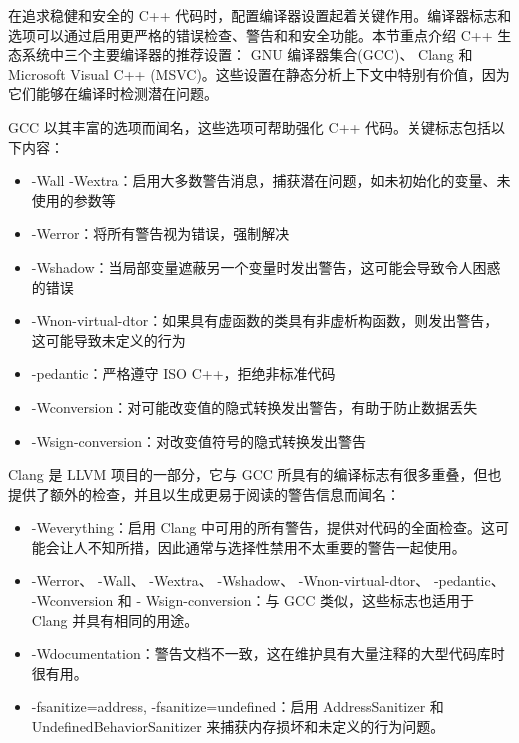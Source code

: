 
在追求稳健和安全的 C++ 代码时，配置编译器设置起着关键作用。编译器标志和选项可以通过启用更严格的错误检查、警告和和安全功能。本节重点介绍 C++ 生态系统中三个主要编译器的推荐设置： GNU 编译器集合(GCC)、 Clang 和 Microsoft Visual C++ (MSVC)。这些设置在静态分析上下文中特别有价值，因为它们能够在编译时检测潜在问题。


GCC 以其丰富的选项而闻名，这些选项可帮助强化 C++ 代码。关键标志包括以下内容：

\begin{itemize}
\item
-Wall -Wextra：启用大多数警告消息，捕获潜在问题，如未初始化的变量、未使用的参数等

\item
-Werror：将所有警告视为错误，强制解决

\item
-Wshadow：当局部变量遮蔽另一个变量时发出警告，这可能会导致令人困惑的错误

\item
-Wnon-virtual-dtor：如果具有虚函数的类具有非虚析构函数，则发出警告，这可能导致未定义的行为

\item
-pedantic：严格遵守 ISO C++，拒绝非标准代码

\item
-Wconversion：对可能改变值的隐式转换发出警告，有助于防止数据丢失

\item
-Wsign-conversion：对改变值符号的隐式转换发出警告
\end{itemize}


Clang 是 LLVM 项目的一部分，它与 GCC 所具有的编译标志有很多重叠，但也提供了额外的检查，并且以生成更易于阅读的警告信息而闻名：

\begin{itemize}
\item
-Weverything：启用 Clang 中可用的所有警告，提供对代码的全面检查。这可能会让人不知所措，因此通常与选择性禁用不太重要的警告一起使用。

\item
-Werror、 -Wall、 -Wextra、 -Wshadow、 -Wnon-virtual-dtor、 -pedantic、 -Wconversion 和 - Wsign-conversion：与 GCC 类似，这些标志也适用于 Clang 并具有相同的用途。

\item
-Wdocumentation：警告文档不一致，这在维护具有大量注释的大型代码库时很有用。

\item
-fsanitize=address, -fsanitize=undefined：启用 AddressSanitizer 和 UndefinedBehaviorSanitizer 来捕获内存损坏和未定义的行为问题。
\end{itemize}

